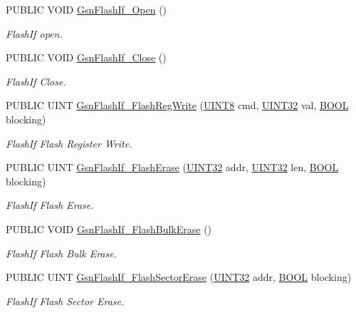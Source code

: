 \begin{DoxyCompactItemize}
PUBLIC VOID \hyperlink{a00647_ga2e45a3d239aacf23775f49d45451cb39}{GsnFlashIf\_\-Open} ()
\begin{DoxyCompactList}\small\item\em FlashIf open. \end{DoxyCompactList}\item 
PUBLIC VOID \hyperlink{a00647_ga35472b38e5592af65b2c3a043f12804a}{GsnFlashIf\_\-Close} ()
\begin{DoxyCompactList}\small\item\em FlashIf Close. \end{DoxyCompactList}\item 
PUBLIC UINT \hyperlink{a00647_ga9984f334abe4f56660d9c05462bfd0cf}{GsnFlashIf\_\-FlashRegWrite} (\hyperlink{a00660_gab27e9918b538ce9d8ca692479b375b6a}{UINT8} cmd, \hyperlink{a00660_gae1e6edbbc26d6fbc71a90190d0266018}{UINT32} val, \hyperlink{a00660_ga1f04022c0a182c51c059438790ea138c}{BOOL} blocking)
\begin{DoxyCompactList}\small\item\em FlashIf Flash Register Write. \end{DoxyCompactList}\item 
PUBLIC UINT \hyperlink{a00647_gaca1b3713dbed6c6ebc74ffd2c690aeea}{GsnFlashIf\_\-FlashErase} (\hyperlink{a00660_gae1e6edbbc26d6fbc71a90190d0266018}{UINT32} addr, \hyperlink{a00660_gae1e6edbbc26d6fbc71a90190d0266018}{UINT32} len, \hyperlink{a00660_ga1f04022c0a182c51c059438790ea138c}{BOOL} blocking)
\begin{DoxyCompactList}\small\item\em FlashIf Flash Erase. \end{DoxyCompactList}\item 
PUBLIC VOID \hyperlink{a00647_gac89f308125de8d40656d8a9e77decc7e}{GsnFlashIf\_\-FlashBulkErase} ()
\begin{DoxyCompactList}\small\item\em FlashIf Flash Bulk Erase. \end{DoxyCompactList}\item 
PUBLIC UINT \hyperlink{a00647_ga204ff2b722664894838958d449b76f0d}{GsnFlashIf\_\-FlashSectorErase} (\hyperlink{a00660_gae1e6edbbc26d6fbc71a90190d0266018}{UINT32} addr, \hyperlink{a00660_ga1f04022c0a182c51c059438790ea138c}{BOOL} blocking)
\begin{DoxyCompactList}\small\item\em FlashIf Flash Sector Erase. \end{DoxyCompactList}\item 

\end{DoxyCompactItemize}
